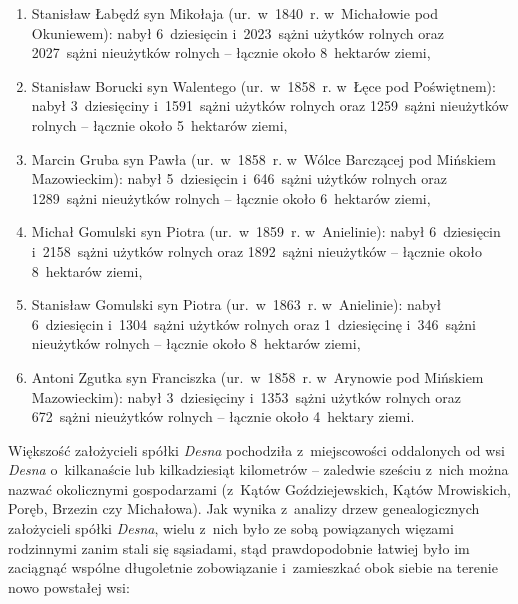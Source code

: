 \begin{enumerate}
    Mazowieckim): nabył 7~dziesięcin i~556~sążni użytków rolnych oraz
    1094~sążni nieużytków rolnych -- łącznie około 8~hektarów ziemi,
    \item Stanisław Łabędź syn Mikołaja (ur.~w~1840~r. w~Michałowie pod
    Okuniewem): nabył 6~dziesięcin i~2023~sążni użytków rolnych oraz
    2027~sążni nieużytków rolnych -- łącznie około 8~hektarów ziemi,
    \item Stanisław Borucki syn Walentego (ur.~w~1858~r. w~Łęce pod
    Poświętnem): nabył 3~dziesięciny i~1591~sążni użytków rolnych oraz
    1259~sążni nieużytków rolnych -- łącznie około 5~hektarów ziemi,
    \item Marcin Gruba syn Pawła (ur.~w~1858~r. w~Wólce Barczącej pod
    Mińskiem Mazowieckim): nabył 5~dziesięcin i~646~sążni użytków rolnych
    oraz 1289~sążni nieużytków rolnych -- łącznie około 6~hektarów ziemi,
    \item Michał Gomulski syn Piotra (ur.~w~1859~r. w~Anielinie): nabył
    6~dziesięcin i~2158~sążni użytków rolnych oraz 1892~sążni nieużytków --
    łącznie około 8~hektarów ziemi,
    \item Stanisław Gomulski syn Piotra (ur.~w~1863~r. w~Anielinie): nabył
    6~dziesięcin i~1304~sążni użytków rolnych oraz 1~dziesięcinę i~346~sążni
    nieużytków rolnych -- łącznie około 8~hektarów ziemi,
    \item Antoni Zgutka syn Franciszka (ur.~w~1858~r. w~Arynowie pod
    Mińskiem Mazowieckim): nabył 3~dziesięciny i~1353~sążni
    użytków rolnych oraz 672~sążni nieużytków rolnych -- łącznie około
    4~hektary ziemi.
\end{enumerate}

Większość założycieli spółki \emph{Desna} pochodziła z~miejscowości oddalonych
od wsi \emph{Desna} o~kilkanaście lub kilkadziesiąt kilometrów -- zaledwie
sześciu z~nich można nazwać okolicznymi gospodarzami (z~Kątów Goździejewskich,
Kątów Mrowiskich, Poręb, Brzezin czy Michałowa). Jak wynika z~analizy drzew
genealogicznych założycieli spółki \emph{Desna}, wielu z~nich było ze sobą
powiązanych więzami rodzinnymi zanim stali się sąsiadami, stąd prawdopodobnie
łatwiej było im zaciągnąć wspólne długoletnie zobowiązanie i~zamieszkać obok
siebie na terenie nowo powstałej wsi:

